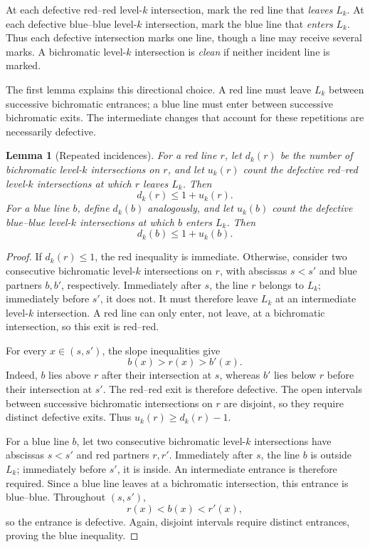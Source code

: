 \documentclass[12pt]{article}
\newtheorem{lemma}[theorem]{Lemma}
\begin{document}
At each defective red--red level-\(k\) intersection, mark the red
line that \emph{leaves} \(L_k\). At each defective blue--blue
level-\(k\) intersection, mark the blue line that \emph{enters}
\(L_k\). Thus each defective intersection marks one line, though a
line may receive several marks. A bichromatic level-\(k\)
intersection is \emph{clean} if neither incident line is marked.

The first lemma explains this directional choice. A red line must
leave \(L_k\) between successive bichromatic entrances; a blue
line must enter between successive bichromatic exits. The
intermediate changes that account for these repetitions are
necessarily defective.

\begin{lemma}[Repeated incidences]\label{lem:repeat}
For a red line \(r\), let \(d_k(r)\) be the number of bichromatic
level-\(k\) intersections on \(r\), and let \(u_k(r)\) count the
defective red--red level-\(k\) intersections at which \(r\) leaves
\(L_k\). Then
\[
 d_k(r)\leq1+u_k(r).
\]
For a blue line \(b\), define \(d_k(b)\) analogously, and let
\(u_k(b)\) count the defective blue--blue level-\(k\) intersections
at which \(b\) enters \(L_k\). Then
\[
 d_k(b)\leq1+u_k(b).
\]
\end{lemma}

\begin{proof}
If \(d_k(r)\leq1\), the red inequality is immediate. Otherwise,
consider two consecutive bichromatic level-\(k\) intersections
on \(r\), with abscissas \(s<s'\) and blue partners \(b,b'\),
respectively. Immediately after \(s\), the line \(r\) belongs to
\(L_k\); immediately before \(s'\), it does not. It must therefore
leave \(L_k\) at an intermediate level-\(k\) intersection.
A red line can only enter, not leave, at a bichromatic
intersection, so this exit is red--red.

For every \(x\in(s,s')\), the slope inequalities give
\[
 b(x)>r(x)>b'(x).
\]
Indeed, \(b\) lies above \(r\) after their intersection at \(s\),
whereas \(b'\) lies below \(r\) before their intersection at \(s'\).
The red--red exit is therefore defective. The open intervals
between successive bichromatic intersections on \(r\) are
disjoint, so they require distinct defective exits. Thus
\(u_k(r)\geq d_k(r)-1\).

For a blue line \(b\), let two consecutive bichromatic
level-\(k\) intersections have abscissas \(s<s'\) and red
partners \(r,r'\). Immediately after \(s\), the line \(b\) is
outside \(L_k\); immediately before \(s'\), it is inside.
An intermediate entrance is therefore required. Since a blue
line leaves at a bichromatic intersection, this entrance is
blue--blue. Throughout \((s,s')\),
\[
 r(x)<b(x)<r'(x),
\]
so the entrance is defective. Again, disjoint intervals require
distinct entrances, proving the blue inequality.
\end{proof}
\end{document}
